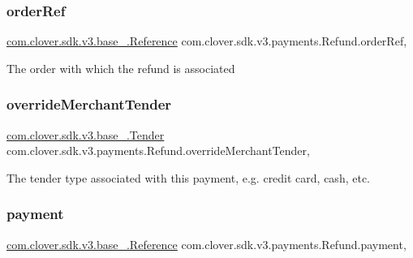 \subsubsection{\texorpdfstring{order\+Ref}{orderRef}}
{\footnotesize\ttfamily \hyperlink{classcom_1_1clover_1_1sdk_1_1v3_1_1base___1_1_reference}{com.\+clover.\+sdk.\+v3.\+base\+\_\+.\+Reference} com.\+clover.\+sdk.\+v3.\+payments.\+Refund.\+order\+Ref\hspace{0.3cm}{\ttfamily [get]}, {\ttfamily [set]}}



The order with which the refund is associated 

\mbox{\label{classcom_1_1clover_1_1sdk_1_1v3_1_1payments_1_1_refund_a42fd1ab2cec842286b312eb5ebfc8dc0}} 
\subsubsection{\texorpdfstring{override\+Merchant\+Tender}{overrideMerchantTender}}
{\footnotesize\ttfamily \hyperlink{classcom_1_1clover_1_1sdk_1_1v3_1_1base___1_1_tender}{com.\+clover.\+sdk.\+v3.\+base\+\_\+.\+Tender} com.\+clover.\+sdk.\+v3.\+payments.\+Refund.\+override\+Merchant\+Tender\hspace{0.3cm}{\ttfamily [get]}, {\ttfamily [set]}}



The tender type associated with this payment, e.\+g. credit card, cash, etc. 

\mbox{\label{classcom_1_1clover_1_1sdk_1_1v3_1_1payments_1_1_refund_a4adaa81a745b0cbfd7ed26d62f4cae13}} 
\subsubsection{\texorpdfstring{payment}{payment}}
{\footnotesize\ttfamily \hyperlink{classcom_1_1clover_1_1sdk_1_1v3_1_1base___1_1_reference}{com.\+clover.\+sdk.\+v3.\+base\+\_\+.\+Reference} com.\+clover.\+sdk.\+v3.\+payments.\+Refund.\+payment\hspace{0.3cm}{\ttfamily [get]}, {\ttfamily [set]}}




